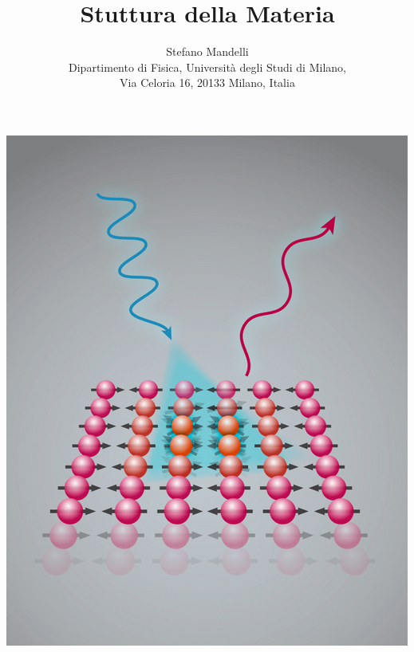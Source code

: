 \documentclass[a4paper,12pt]{article}
\begin{document}
\title{\bf \Huge Stuttura della Materia}

\author{Stefano Mandelli\\
	Dipartimento di Fisica, Universit\`a degli Studi di Milano,\\
	Via Celoria 16, 20133 Milano, Italia
}

\maketitle
\begin{center}
\includegraphics[scale=0.9]{IMG/copertina.jpg}
\end{center}

\newpage
\tableofcontents
\newpage

\end{document}
